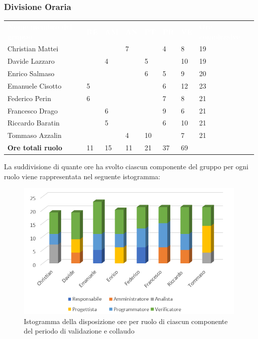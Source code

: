 \subsubsection{Divisione Oraria}
{
	\renewcommand{\arraystretch}{2}
	\centering
	\begin{longtable}{ C{5cm} C{1cm} C{1cm} C{1cm} C{1cm} C{1cm} C{1cm} C{3cm}}
		\textcolor{white}{\textbf{Nome membro del gruppo}} & \textcolor{white}{\textbf{RE}} & \textcolor{white}{\textbf{AM}} & \textcolor{white}{\textbf{AN}} & \textcolor{white}{\textbf{PT}} & \textcolor{white}{\textbf{PR}} & \textcolor{white}{\textbf{VE}} & \textcolor{white}{\textbf{Ore complessive}}\\	
        
        Christian Mattei & & & 7 & & 4 & 8 & 19\\
        Davide Lazzaro & & 4 & & 5 & & 10 & 19\\
        Enrico Salmaso & & & & 6 & 5 & 9 & 20\\
        Emanuele Cisotto & 5 & & & & 6 & 12 & 23 \\
        Federico Perin & 6 & & & & 7 & 8 & 21\\
        Francesco Drago & & 6 & & & 9 & 6 & 21\\
        Riccardo Baratin & & 5 & & & 6 & 10 & 21\\
        Tommaso Azzalin & & & 4 & 10 & & 7 & 21\\
        \textbf{Ore totali ruolo} & 11 & 15 & 11 & 21 & 37 & 69 & \\
		
	\end{longtable}
}


La suddivisione di quante ore ha svolto ciascun componente del gruppo per ogni ruolo viene rappresentata nel seguente istogramma:

\begin{figure}[h]
	\centering
	\includegraphics[scale=2.5]{sezioni/Istogrammi/IstogrammaValidazione.png}
	\caption{Istogramma della disposizione ore per ruolo di ciascun componente del periodo di validazione e collaudo}
\end{figure}


